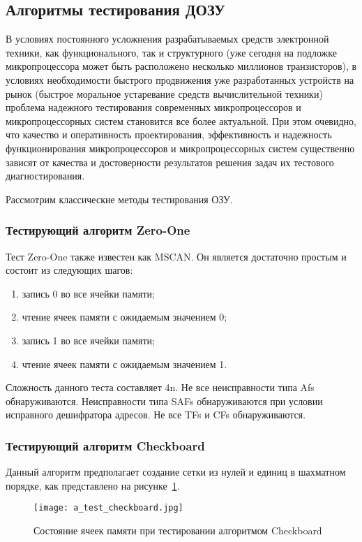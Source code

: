 \subsection{Алгоритмы тестирования ДОЗУ}
\label{sub:domain:tests}
В условиях постоянного усложнения разрабатываемых средств электронной техники, как функционального, так и структурного (уже сегодня на подложке микропроцессора может быть расположено несколько миллионов транзисторов), в условиях необходимости быстрого продвижения уже разработанных устройств на рынок (быстрое моральное устаревание средств вычислительной техники) проблема надежного тестирования современных микропроцессоров и микропроцессорных систем становится все более актуальной. При этом очевидно, что качество и оперативность проектирования, эффективность и надежность функционирования микропроцессоров и микропроцессорных систем существенно зависят от качества и достоверности результатов решения задач их тестового диагностирования.

Рассмотрим классические методы тестирования ОЗУ.

\subsubsection{Тестирующий алгоритм Zero-One}
\label{sub:domain:tests:zero-one}
Тест Zero-One также известен как MSCAN. Он является достаточно простым и состоит из следующих шагов:
\begin{enumerate}
\item запись 0 во все ячейки памяти;
\item чтение ячеек памяти с ожидаемым значением 0;
\item запись 1 во все ячейки памяти;
\item чтение ячеек памяти с ожидаемым значением 1.
\end{enumerate}
Сложность данного теста составляет 4n. Не все неисправности типа Afs обнаруживаются. Неисправности типа SAFs обнаруживаются при условии исправного дешифратора адресов. Не все TFs и CFs обнаруживаются.

\subsubsection{Тестирующий алгоритм Checkboard}
\label{sub:domain:tests:checkboard}
Данный алгоритм предполагает создание сетки из нулей и единиц в шахматном порядке, как представлено на рисунке~\ref{fig:domain:tests:checkboard}. 

\begin{figure}[ht]
\centering
  \texttt{[image: a\_test\_checkboard.jpg]}  
  \caption{Состояние ячеек памяти при тестировании алгоритмом Checkboard}
  \label{fig:domain:tests:checkboard}
\end{figure}

